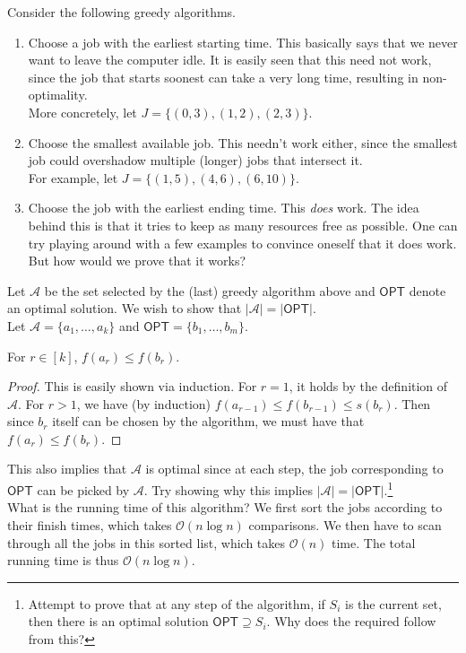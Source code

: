 Consider the following greedy algorithms.

\begin{enumerate}
	\item Choose a job with the earliest starting time. This basically says that we never want to leave the computer idle. It is easily seen that this need not work, since the job that starts soonest can take a very long time, resulting in non-optimality.\\
	More concretely, let $J = \{(0,3),(1,2),(2,3)\}$.

	\item Choose the smallest available job. This needn't work either, since the smallest job could overshadow multiple (longer) jobs that intersect it.\\
	For example, let $J=\{(1,5),(4,6),(6,10)\}$.

	\item Choose the job with the earliest ending time. This \textit{does} work. The idea behind this is that it tries to keep as many resources free as possible. One can try playing around with a few examples to convince oneself that it does work.\\
	But how would we prove that it works?
\end{enumerate}

Let $\mathcal{A}$ be the set selected by the (last) greedy algorithm above and $\mathsf{OPT}$ denote an optimal solution. We wish to show that $|\mathcal{A}|=|\mathsf{OPT}|$.\\
Let $\mathcal{A}=\{a_1,\ldots,a_k\}$ and $\mathsf{OPT}=\{b_1,\ldots,b_m\}$.

\begin{lemma*}
For $r\in[k]$, $f(a_r) \leq f(b_r)$.
\end{lemma*}
\begin{proof}
This is easily shown via induction. For $r=1$, it holds by the definition of $\mathcal{A}$. For $r>1$, we have (by induction) $f(a_{r-1}) \leq f(b_{r-1}) \leq s(b_r)$. Then since $b_r$ itself can be chosen by the algorithm, we must have that $f(a_r) \leq f(b_r)$.
\end{proof}

This also implies that $\mathcal{A}$ is optimal since at each step, the job corresponding to $\mathsf{OPT}$ can be picked by $\mathcal{A}$. Try showing why this implies $|\mathcal{A}|=|\mathsf{OPT}|$.\footnote{Attempt to prove that at any step of the algorithm, if $S_i$ is the current set, then there is an optimal solution $\mathsf{OPT}\supseteq S_i$. Why does the required follow from this?}\\
What is the running time of this algorithm? We first sort the jobs according to their finish times, which takes $\mathcal{O}(n\log n)$ comparisons. We then have to scan through all the jobs in this sorted list, which takes $\mathcal{O}(n)$ time. The total running time is thus $\mathcal{O}(n\log n)$.

